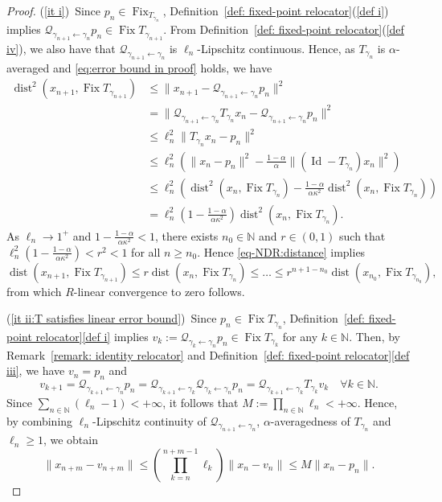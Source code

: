 \documentclass[a4paper,12pt]{article}
\DeclareMathOperator{\Id}{Id}
\DeclareMathOperator{\Fix}{Fix}
\DeclareMathOperator{\dist}{dist}
\begin{document}
\begin{proof}
 (\ref{it i})~Since $p_n\in\Fix_{T_{\gamma_{n}}}$, Definition~\ref{def: fixed-point relocator}(\ref{def i}) implies $\mathcal{Q}_{\gamma_{n+1}\leftarrow\gamma_n}p_n\in\Fix T_{\gamma_{n+1}}$. From Definition~\ref{def: fixed-point relocator}(\ref{def iv}), we also have that $\mathcal{Q}_{\gamma_{n+1}\leftarrow\gamma_n}$ is $\ell_n$-Lipschitz continuous. Hence, as $T_{\gamma_n}$ is $\alpha$-averaged and \eqref{eq:error bound in proof} holds, we have
    \begin{equation}\label{eq-NDR:distance}
    \begin{aligned}
    \dist^2(x_{n+1},\Fix T_{\gamma_{n+1}})&\leq\|x_{n+1}-\mathcal{Q}_{\gamma_{n+1}\leftarrow\gamma_n}p_n\|^2\\
    &=\|\mathcal{Q}_{\gamma_{n+1}\leftarrow\gamma_n}T_{\gamma_n}x_n-\mathcal{Q}_{\gamma_{n+1}\leftarrow\gamma_n}p_n\|^2\\
    &\leq\ell_n^2\|T_{\gamma_{n}}x_n-p_n\|^2\\
    &\leq \ell_n^2(\|x_n-p_n\|^2-\frac{1-\alpha}{\alpha}\|(\Id-T_{\gamma_n})x_n\|^2)\\
    &\leq \ell_n^2(\dist^2(x_n,\Fix T_{\gamma_n})-\frac{1-\alpha}{\alpha\kappa^2}\dist^2(x_n,\Fix T_{\gamma_n}))\\
    &=\ell_n^2(1-\frac{1-\alpha}{\alpha\kappa^2})\dist^2(x_n,\Fix T_{\gamma_n}).
    \end{aligned}
    \end{equation}
    As $\ell_n\to 1^+$ and $1-\frac{1-\alpha}{\alpha\kappa^2}<1$, there exists $n_0\in\mathbb{N}$ and $r\in(0,1)$ such that $\ell_n^2(1-\frac{1-\alpha}{\alpha\kappa^2})<r^2<1$ for all $n\geq n_0$. Hence \eqref{eq-NDR:distance} implies
     \begin{equation}\label{eq-NDR:12*}
         \dist(x_{n+1},\Fix T_{\gamma_{n+1}})\leq r\dist(x_{n},\Fix T_{\gamma_{n}})\leq \dots\leq r^{n+1-n_0}\dist(x_{n_0},\Fix T_{\gamma_{n_0}}),
     \end{equation}
     from which $R$-linear convergence to zero follows.

    
(\ref{it ii:T satisfies linear error bound})~Since $p_n\in\Fix T_{\gamma_n}$, Definition~\ref{def: fixed-point relocator}\eqref{def i} implies  $v_{k}:=\mathcal{Q}_{\gamma_{k}\leftarrow\gamma_n}p_n\in\Fix {T_{\gamma_{k}}}$ for any $k\in\mathbb{N}$. Then, by Remark~\ref{remark: identity relocator} and Definition~\ref{def: fixed-point relocator}\eqref{def iii}, we have $v_n=p_n$ and
     $$ v_{k+1} = \mathcal{Q}_{\gamma_{k+1}\leftarrow\gamma_n}p_n = \mathcal{Q}_{\gamma_{k+1}\leftarrow\gamma_k}\mathcal{Q}_{\gamma_{k}\leftarrow\gamma_n}p_n=\mathcal{Q}_{\gamma_{k+1}\leftarrow\gamma_k}T_{\gamma_k}v_k\quad\forall k\in\mathbb{N}. $$
   Since $\sum_{n\in\mathbb{N}}(\ell_n-1)<+\infty$, it follows that $M:=\prod_{n\in\mathbb{N}}\ell_n<+\infty$. Hence, by combining $\ell_n$-Lipschitz continuity of $\mathcal{Q}_{\gamma_{n+1}\leftarrow\gamma_n}$, $\alpha$-averagedness of $T_{\gamma_n}$ and $\ell_n \geq 1$, we obtain
     \begin{equation}\label{eq:v_n+m}
          \|x_{n+m}-v_{n+m}\| 
          \leq \left(\prod_{k=n}^{n+m-1}\ell_{k}\right)\|x_n-v_n\|\leq M\|x_n-p_n\|. 
    \end{equation}
   

\end{proof}
\end{document}
